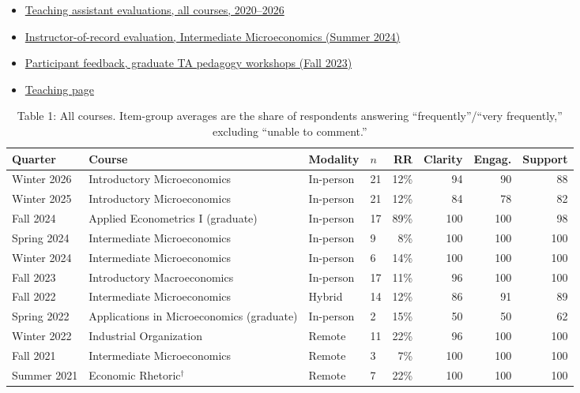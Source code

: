 \documentclass[letter,11pt]{article}
\begin{document}
\begin{itemize}
    \item \href{https://gagandeep-sachdeva.com/teaching/TA_Evals_All_2020_2026.pdf}{Teaching assistant evaluations, all courses, 2020--2026}
    \item \href{https://gagandeep-sachdeva.com/teaching/teachingevals_GSI.pdf}{Instructor-of-record evaluation, Intermediate Microeconomics (Summer 2024)}
    \item \href{https://gagandeep-sachdeva.com/teaching/Feedback\%20for\%20TA\%20Workshops-\%20Fall\%202023.pdf}{Participant feedback, graduate TA pedagogy workshops (Fall 2023)}
    \item \href{https://gagandeep-sachdeva.com/teaching.html}{Teaching page}
\end{itemize}

\begin{table}[htbp!]
\captionsetup{labelformat=empty}
\caption*{Table 1: All courses. Item-group averages are the share of respondents answering ``frequently''/``very frequently,'' excluding ``unable to comment.''}
\centering
{\small
\begin{tabular}{llllrrrr}
\toprule
Quarter & Course & Modality & $n$ & RR & Clarity & Engag. & Support \\
\midrule
Winter 2026 & Introductory Microeconomics & In-person & 21 & 12\% & 94 & 90 & 88 \\
Winter 2025 & Introductory Microeconomics & In-person & 21 & 12\% & 84 & 78 & 82 \\
Fall 2024 & Applied Econometrics I (graduate) & In-person & 17 & 89\% & 100 & 100 & 98 \\
Spring 2024 & Intermediate Microeconomics & In-person & 9 & 8\% & 100 & 100 & 100 \\
Winter 2024 & Intermediate Microeconomics & In-person & 6 & 14\% & 100 & 100 & 100 \\
Fall 2023 & Introductory Macroeconomics & In-person & 17 & 11\% & 96 & 100 & 100 \\
Fall 2022 & Intermediate Microeconomics & Hybrid & 14 & 12\% & 86 & 91 & 89 \\
Spring 2022 & Applications in Microeconomics (graduate) & In-person & 2 & 15\% & 50 & 50 & 62 \\
Winter 2022 & Industrial Organization & Remote & 11 & 22\% & 96 & 100 & 100 \\
Fall 2021 & Intermediate Microeconomics & Remote & 3 & 7\% & 100 & 100 & 100 \\
Summer 2021 & Economic Rhetoric$^{\dagger}$ & Remote & 7 & 22\% & 100 & 100 & 100 \\

\end{tabular}}
\end{table}
\end{document}
